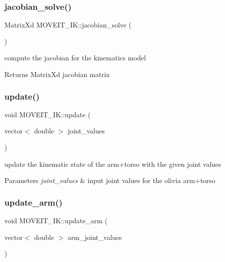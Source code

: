 \subsubsection{\texorpdfstring{jacobian\+\_\+solve()}{jacobian\_solve()}}
{\footnotesize\ttfamily Matrix\+Xd M\+O\+V\+E\+I\+T\+\_\+\+I\+K\+::jacobian\+\_\+solve (\begin{DoxyParamCaption}{ }\end{DoxyParamCaption})\hspace{0.3cm}{\ttfamily [inline]}}



compute the jacobian for the kinematics model 

\begin{DoxyReturn}{Returns}
Matrix\+Xd jacobian matrix 
\end{DoxyReturn}
\mbox{\label{classMOVEIT__IK_a1399d0e0159b8ed7af938116fee6dc93}} 
\subsubsection{\texorpdfstring{update()}{update()}}
{\footnotesize\ttfamily void M\+O\+V\+E\+I\+T\+\_\+\+I\+K\+::update (\begin{DoxyParamCaption}\item[{vector$<$ double $>$}]{joint\+\_\+values }\end{DoxyParamCaption})\hspace{0.3cm}{\ttfamily [inline]}}



update the kinematic state of the arm+torso with the given joint values 


\begin{DoxyParams}{Parameters}
{\em joint\+\_\+values} & input joint values for the olivia arm+torso \\
\hline
\end{DoxyParams}
\mbox{\label{classMOVEIT__IK_a0bdc6f6a1cefeaad6651495c463dd6ed}} 
\subsubsection{\texorpdfstring{update\+\_\+arm()}{update\_arm()}}
{\footnotesize\ttfamily void M\+O\+V\+E\+I\+T\+\_\+\+I\+K\+::update\+\_\+arm (\begin{DoxyParamCaption}\item[{vector$<$ double $>$}]{arm\+\_\+joint\+\_\+values }\end{DoxyParamCaption})\hspace{0.3cm}{\ttfamily [inline]}}



